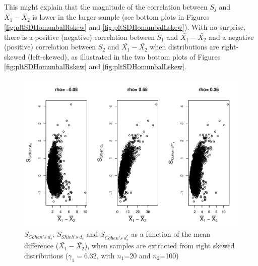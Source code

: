 \documentclass[
  english,
  man,mask]{apa6}
\begin{document}
This might explain that the magnitude of the correlation between \(S_j\) and \(\bar{X_1}-\bar{X_2}\) is lower in the larger sample (see bottom plots in Figures \ref{fig:pltSDHomunbalRskew} and \ref{fig:pltSDHomunbalLskew}). With no surprise, there is a positive (negative) correlation between \(S_1\) and \(\bar{X_1}-\bar{X_2}\) and a negative (positive) correlation between \(S_2\) and \(\bar{X_1}-\bar{X_2}\) when distributions are right-skewed (left-skewed), as illustrated in the two bottom plots of Figures \ref{fig:pltSDHomunbalRskew} and \ref{fig:pltSDHomunbalLskew}.

\begin{figure}
\centering
\includegraphics{Correlation_files/figure-latex/pltStdzrHomunbalRskew-1.pdf}
\caption{\label{fig:pltStdzrHomunbalRskew}\(S_{Cohen's \; d_s}\), \(S_{Shieh's \; d_s}\) and \(S_{Cohen's \; d^*_s}\) as a function of the mean difference (\(\bar{X_1}-\bar{X_2}\)), when samples are extracted from right skewed distributions (\(\gamma_1 = 6.32\), with \(n_1\)=20 and \(n_2\)=100)}
\end{figure}
\end{document}
